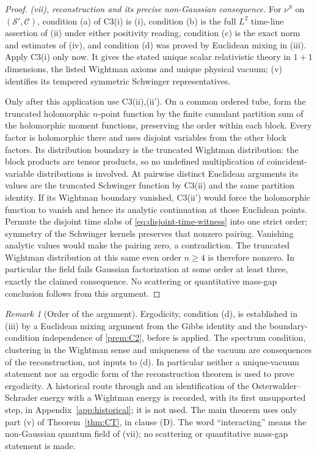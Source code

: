 \documentclass[11pt]{article}
\theoremstyle{plain}
\theoremstyle{definition}
\theoremstyle{remark}
\newtheorem{remark}[theorem]{Remark}
\newcommand{\cC}{\mathcal{C}}
\newcommand{\cS}{\mathcal{S}}
\begin{document}
\begin{proof}
\label{proof:CT-vii}
\emph{(vii), reconstruction and its precise non-Gaussian consequence.}
For $\nu^S$ on $(\cS',\cC)$, condition (a) of C3(i) is (i), condition
(b) is the full $L^2$ time-line assertion of (ii) under either positivity
reading, condition (c) is the exact norm and estimates of (iv), and
condition (d) was proved by Euclidean mixing in (iii).
Apply C3(i) only now. It gives the stated unique scalar relativistic
theory in $1+1$ dimensions, the listed Wightman axioms and unique physical
vacuum; (v) identifies its tempered symmetric Schwinger representatives.

Only after this application use C3(ii),(ii'). On a common ordered tube,
form the truncated holomorphic $n$-point function by the finite cumulant
partition sum of the holomorphic moment functions, preserving the order
within each block. Every factor is holomorphic there and uses disjoint
variables from the other block factors. Its distribution boundary is the
truncated Wightman distribution: the block products are tensor products,
so no undefined multiplication of coincident-variable distributions is
involved. At pairwise distinct Euclidean arguments its values are the
truncated Schwinger function by C3(ii) and the same partition identity.
If its Wightman boundary vanished, C3(ii') would force the holomorphic
function to vanish and hence its analytic continuation at those Euclidean
points. Permute the disjoint time slabs of
\eqref{eq:disjoint-time-witness} into one strict order; symmetry of the
Schwinger kernels preserves that nonzero pairing. Vanishing analytic
values would make the pairing zero, a contradiction. The truncated
Wightman distribution at this same even order $n\ge4$ is therefore
nonzero. In particular the field fails Gaussian factorization at some
order at least three, exactly the claimed consequence. No scattering or
quantitative mass-gap conclusion follows from this argument.
\end{proof}


\begin{remark}[Order of the argument]\label{rem:CT-order}
Ergodicity, condition (d), is established in (iii) by a Euclidean mixing
argument from the Gibbs identity and the boundary-condition independence of
\ref{prem:C2}, before \cite[Thm.~1.0]{FS1977} is applied. The spectrum condition,
clustering in the Wightman sense and uniqueness of the vacuum are consequences
of the reconstruction, not inputs to (d). In particular neither a unique-vacuum
statement nor an ergodic form of the reconstruction theorem is used to prove
ergodicity. A historical route through \cite[Thm.~4.4]{FS1977} and an
identification of the Osterwalder--Schrader energy with a Wightman energy is
recorded, with its first unsupported step, in Appendix~\ref{app:historical}; it is
not used. The main theorem uses only part (v) of Theorem~\ref{thm:CT}, in clause
(D). The word ``interacting'' means the non-Gaussian quantum field of (vii);
no scattering or quantitative mass-gap statement is made.
\end{remark}
\end{document}

